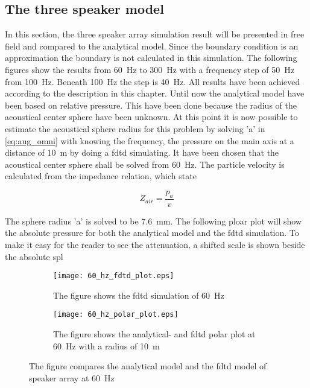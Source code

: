 \subsection{The three speaker model} \label{the_simulation_result}
In this section, the three speaker array simulation result will be presented in free field and compared to the analytical model. Since the boundary condition is an approximation the boundary is not calculated in this simulation. The following figures show the results from \SI{60}{\hertz} to \SI{300}{\hertz} with a frequency step of \SI{50}{\hertz} from \SI{100}{\hertz}. Beneath \SI{100}{\hertz} the step is \SI{40}{\hertz}. All results have been achieved according to the description in this chapter. Until now the analytical model have been based on relative pressure. This have been done because the radius of the acoustical center sphere have been unknown. At this point it is now possible to estimate the acoustical sphere radius for this problem by solving 'a' in \autoref{eq:aug_omni} with knowing the frequency, the pressure on the main axis at a distance of \SI{10}{\meter} by doing a \gls{fdtd} simulating. It have been chosen that the acoustical center sphere shall be solved from \SI{60}{\hertz}. The particle velocity is calculated from the impedance relation, which state

\begin{equation}
Z_{air}=\frac{p_a}{v}
\end{equation}  

    \startexplain
    \stopexplain

The sphere radius 'a' is solved to be \SI{7.6}{\milli\meter}. The following ploar plot will show the absolute pressure for both the analytical model and the \gls{fdtd} simulation. To make it easy for the reader to see the attenuation, a shifted scale is shown beside the absolute \gls{spl}




\begin{figure}[H]
\centering
\begin{subfigure}[htbp]{0.55\textwidth}
		\texttt{[image: 60\_hz\_fdtd\_plot.eps]}
		\caption{The figure shows the \gls{fdtd} simulation of \SI{60}{\hertz}}
		\label{fig:fdtd_60_Hz}
\end{subfigure}
\begin{subfigure}[htbp]{0.35\textwidth}
		\texttt{[image: 60\_hz\_polar\_plot.eps]}
		\caption{The figure shows the analytical- and \gls{fdtd} polar plot at \SI{60}{\hertz} with a radius of \SI{10}{\meter}}
		\label{fig:polar_60_Hz}
\end{subfigure} 
\caption{The figure compares the analytical model and the \gls{fdtd} model of speaker array at \SI{60}{\hertz}}
\end{figure}


